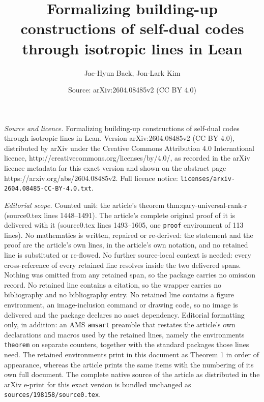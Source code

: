 \documentclass[10pt,a4paper]{amsart}
\title{Formalizing building-up constructions of self-dual codes through isotropic lines in Lean}
\author{Jae-Hyun Baek, Jon-Lark Kim}
\date{Source: arXiv:2604.08485v2 (CC BY 4.0)}
\begin{document}
\maketitle

\noindent\emph{Source and licence.} Formalizing building-up constructions of self-dual codes through isotropic lines in Lean. Version arXiv:2604.08485v2 (CC BY 4.0), distributed by arXiv under the Creative Commons Attribution 4.0 International licence, http://creativecommons.org/licenses/by/4.0/, as recorded in the arXiv licence metadata for this exact version and shown on the abstract page https://arxiv.org/abs/2604.08485v2. Full licence notice: \texttt{licenses/arxiv-2604.08485-CC-BY-4.0.txt}.\par\smallskip

\noindent\textit{Editorial scope.} Counted unit: the article's theorem thm:qary-universal-rank-r (source0.tex lines 1448--1491). The article's complete original proof of it is delivered with it (source0.tex lines 1493--1605, one \texttt{proof} environment of 113 lines). No mathematics is written, repaired or re-derived: the statement and the proof are the article's own lines, in the article's own notation, and no retained line is substituted or re-flowed.  No further source-local context is needed: every cross-reference of every retained line resolves inside the two delivered spans.  Nothing was omitted from any retained span, so the package carries no omission record.  No retained line contains a citation, so the wrapper carries no bibliography and no bibliography entry.  No retained line contains a figure environment, an image-inclusion command or drawing code, so no image is delivered and the package declares no asset dependency.  Editorial formatting only, in addition: an AMS \texttt{amsart} preamble that restates the article's own declarations and macros used by the retained lines, namely the environments \texttt{theorem} on separate counters, together with the standard packages those lines need.  The retained environments print in this document as Theorem 1 in order of appearance, whereas the article prints the same items with the numbering of its own full document.  The complete native source of the article as distributed in the arXiv e-print for this exact version is bundled unchanged as \texttt{sources/198158/source0.tex}.
\end{document}
